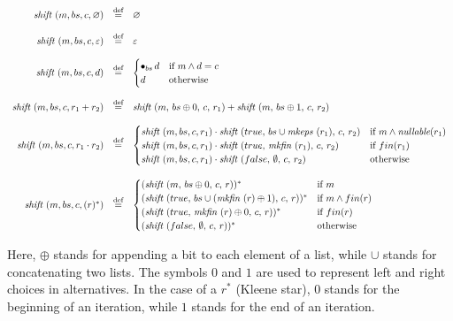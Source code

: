 \documentclass[12pt]{article}
\newcommand{\shift}{\textit{shift }}
\newcommand{\mkeps}{\textit{mkeps }}
\newcommand{\nullable}{\textit{nullable}}
\newcommand{\mkfin}{\textit{mkfin }}
\begin{document}
\[
\begin{array}{rcl}
  \shift(m,bs,c,\varnothing)              & \stackrel{\text{def}}{=} & \varnothing \\\\
  \shift(m,bs,c,\varepsilon)              & \stackrel{\text{def}}{=} & \varepsilon \\\\
  \shift(m,bs,c,d)                        & \stackrel{\text{def}}{=} & 
   \begin{cases}
    \bullet_{bs} \, d & \text{if  $ m \land d = c $}\\
    d                 & \text{otherwise}
   \end{cases} \\\\

  \shift(m,bs,c, r_1 + r_2)     & \stackrel{\text{def}}{=} & 
    \shift(m,\, bs \oplus 0,\, c,\, r_1) + \shift(m,\, bs \oplus 1,\, c,\, r_2) \\\\
  
  \shift(m,bs,c, r_1 \cdot r_2) & \stackrel{\text{def}}{=} &
  \begin{cases}
      \shift(m,bs,c,r_1) \cdot \shift(true,\, bs \cup \mkeps(r_1),\, c,\, r_2) & \text{if $ m \land \nullable(r_1) $}\\
      \shift(m,bs,c,r_1) \cdot \shift(true,\, \mkfin(r_1),\, c,\, r_2)         & \text{if $ fin(r_1) $}\\
      \shift(m,bs,c,r_1) \cdot \shift(false,\, \emptyset,\, c,\, r_2)          & \text{otherwise} 
    \end{cases}  \\\\

  \shift(m,bs,c,(r)^*)          & \stackrel{\text{def}}{=} &
    \begin{cases}
      (\shift(m,\, bs \oplus 0,\, c,\, r))^*                       & \text{if $ m $} \\
      (\shift(true,\, bs \cup (\mkfin(r) \oplus 1),\, c,\, r))^*   & \text{if $ m \land fin(r) $} \\
      (\shift(true,\, \mkfin(r) \oplus 0,\, c,\, r))^*             & \text{if $ fin(r) $} \\
      (\shift(false,\, \emptyset,\, c,\, r))^*                     & \text{otherwise}
    \end{cases}
\end{array}
\]

Here, $\oplus$ stands for appending a bit to each element of a list, while $\cup$ stands for concatenating two lists.  
The symbols $0$ and $1$ are used to represent left and right choices in alternatives.  
In the case of a $r^*$ (Kleene star), $0$ stands for the beginning of an iteration,  while $1$ stands for the end of an iteration.
\end{document}
